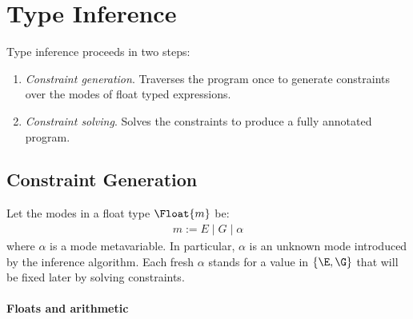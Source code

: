 \section{Type Inference}
Type inference proceeds in two steps: 

\begin{enumerate}
    \item \textit{Constraint generation}. Traverses the program once to generate constraints over the modes of float typed expressions.
    \item \textit{Constraint solving}. Solves the constraints to produce a fully annotated program.
\end{enumerate}

\subsection{Constraint Generation}
Let the modes in a float type $\Float{m}$ be:
\begin{align*}
    m := E \mid G \mid \alpha
\end{align*}
where $\alpha$ is a mode metavariable. In particular, $\alpha$ is an unknown mode introduced by the inference algorithm. Each fresh $\alpha$ stands for a value in $\{\E, \G\}$ that will be fixed later by solving constraints.

\paragraph{Floats and arithmetic}

